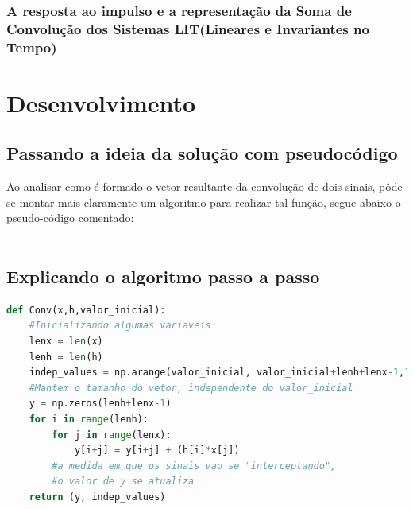 \documentclass[dvipdfm, a4paper, 11pt]{report}
\begin{document}
{\subsection{A resposta ao impulso e a representação da Soma de Convolução dos Sistemas LIT(Lineares e Invariantes no Tempo)}

\chapter{Desenvolvimento}\label{desenv}

\section{Passando a ideia da solução com pseudocódigo}
Ao analisar como é formado o vetor resultante da convolução de dois sinais, pôde-se montar mais claramente um algoritmo para realizar tal função, segue abaixo o pseudo-código comentado:\\
\\
\begin{algorithm}[H]

\end{algorithm}

\section{Explicando o algoritmo passo a passo}

\small{
\begin{lstlisting}[language = python]
def Conv(x,h,valor_inicial):
	#Inicializando algumas variaveis
	lenx = len(x)
	lenh = len(h)
	indep_values = np.arange(valor_inicial, valor_inicial+lenh+lenx-1,1)
	#Mantem o tamanho do vetor, independente do valor_inicial
	y = np.zeros(lenh+lenx-1)
	for i in range(lenh):
		for j in range(lenx):
			y[i+j] = y[i+j] + (h[i]*x[j]) 
		#a medida em que os sinais vao se "interceptando", 
		#o valor de y se atualiza
	return (y, indep_values)


\end{lstlisting}}}
\end{document}
